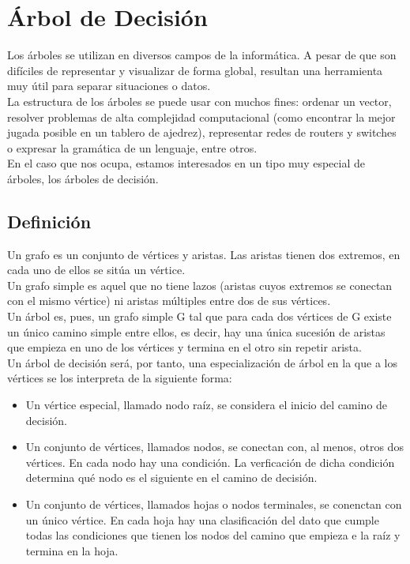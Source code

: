 \section{\'Arbol de Decisi\'on}\label{sec:Decision_tree}
	
		Los \'arboles se utilizan en diversos campos de la inform\'atica. A pesar de que son dif\'iciles de representar y visualizar de forma global, resultan una herramienta muy \'util para separar situaciones o datos.\\
		
		La estructura de los \'arboles se puede usar con muchos fines: ordenar un vector, resolver problemas de alta complejidad computacional (como encontrar la mejor jugada posible en un tablero de ajedrez), representar redes de routers y switches o expresar la gram\'atica de un lenguaje, entre otros.\\
		
		En el caso que nos ocupa, estamos interesados en un tipo muy especial de \'arboles, los \'arboles de decisi\'on.\\
		
		\subsection{Definici\'on}
			Un grafo es un conjunto de v\'ertices y aristas. Las aristas tienen dos extremos, en cada uno de ellos se sit\'ua un v\'ertice.\\
			
			Un grafo simple es aquel que no tiene lazos (aristas cuyos extremos se conectan con el mismo v\'ertice) ni aristas m\'ultiples entre dos de sus v\'ertices.\\
			
			Un \'arbol es, pues, un grafo simple G tal que
			para cada dos v\'ertices de G existe un \'unico camino simple entre ellos, es decir, hay una \'unica sucesi\'on de aristas que empieza en uno de los v\'ertices y termina en el otro sin repetir arista.\\
			
			Un \'arbol de decisi\'on ser\'a, por tanto, una especializaci\'on de \'arbol en la que a los v\'ertices se los interpreta de la siguiente forma:\\
			
			\begin{itemize}
				\item Un v\'ertice especial, llamado nodo ra\'iz, se considera el inicio del camino de decisi\'on.
				\item Un conjunto de v\'ertices, llamados nodos, se conectan con, al menos, otros dos v\'ertices. En cada nodo hay una condici\'on. La verficaci\'on de dicha condici\'on determina qu\'e nodo es el siguiente en el camino de decisi\'on.
				\item Un conjunto de v\'ertices, llamados hojas o nodos terminales, se conenctan con un \'unico v\'ertice. En cada hoja hay una clasificaci\'on del dato que cumple todas las condiciones que tienen los nodos del camino que empieza e la ra\'iz y termina en la hoja. 
			\end{itemize}
			
